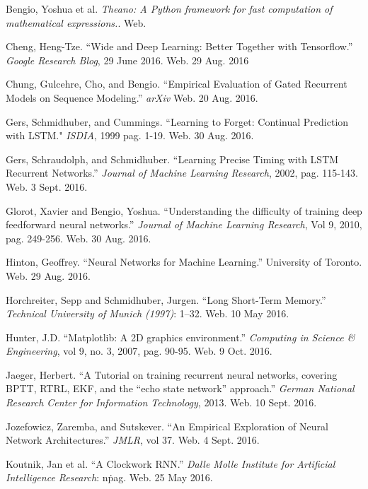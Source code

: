 \documentclass[12pt, titlepage]{article}
\begin{document}
\begin{thebibliography}{9}
		Bengio, Yoshua et al. \textit{Theano: A Python framework for fast
		computation of mathematical expressions.}. Web.

		Cheng, Heng-Tze. ``Wide and Deep Learning: Better Together with
		Tensorflow.'' \textit{Google Research Blog}, 29 June 2016. Web. 29 Aug.
		2016

		Chung, Gulcehre, Cho, and Bengio. ``Empirical Evaluation of Gated
		Recurrent Models on Sequence Modeling.'' \textit{arXiv} Web. 20 Aug.
		2016.

		Gers, Schmidhuber, and Cummings. ``Learning to Forget: Continual
		Prediction with LSTM." \textit{ISDIA}, 1999 pag. 1-19. Web. 30 Aug.
		2016.

		Gers, Schraudolph, and Schmidhuber. ``Learning Precise Timing with LSTM
		Recurrent Networks.'' \textit{Journal of Machine Learning Research},
		2002, pag. 115-143. Web. 3 Sept. 2016.

		Glorot, Xavier and Bengio, Yoshua. ``Understanding the difficulty of
		training deep feedforward neural networks.'' \textit{Journal of Machine
		Learning Research}, Vol 9, 2010, pag. 249-256. Web. 30 Aug. 2016.

		Hinton, Geoffrey. ``Neural Networks for Machine Learning.'' University
		of Toronto. Web. 29 Aug. 2016.

		Horchreiter, Sepp and Schmidhuber, Jurgen. ``Long Short-Term Memory.''
		\textit{Technical University of Munich (1997)}: 1--32. Web. 10 May 2016.

		Hunter, J.D. ``Matplotlib: A 2D graphics environment.''
		\textit{Computing in Science \& Engineering}, vol 9, no. 3, 2007, pag.
		90-95. Web. 9 Oct.  2016.

		Jaeger, Herbert. ``A Tutorial on training recurrent neural networks,
		covering BPTT, RTRL, EKF, and the ``echo state network''
		approach.'' \textit{German National Research Center for Information
		Technology}, 2013. Web. 10 Sept. 2016.

		Jozefowicz, Zaremba, and Sutskever. ``An Empirical Exploration of Neural
		Network Architectures.'' \textit{JMLR}, vol 37. Web. 4 Sept. 2016.

		Koutnik, Jan et al. ``A Clockwork RNN.'' \textit{Dalle Molle Institute
		for Artificial Intelligence Research}: n\. pag. Web. 25 May 2016.


\end{thebibliography}
\end{document}
